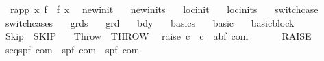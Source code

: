\begin{isabellebody}
\ \ \ {\isachardoublequoteopen}rapp\ x\ f\ {\isacharequal}\ f\ x{\isachardoublequoteclose}\isanewline
\isanewline
\isanewline
{}\isamarkupfalse%
\isanewline
\ \ newinit\ \isanewline
\ \ newinits\ \isanewline
\ \ locinit\ \isanewline
\ \ locinits\ \isanewline
\ \ switchcase\ \isanewline
\ \ switchcases\ \isanewline
\ \ grds\ \isanewline
\ \ grd\ \isanewline
\ \ bdy\ \isanewline
\ \ basics\ \isanewline
\ \ basic\ \isanewline
\ \ basicblock\isanewline
\isanewline
{}\isamarkupfalse%
\isanewline
\ \ Skip\ \ {\isacharparenleft}{\isachardoublequoteopen}SKIP{\isachardoublequoteclose}{\isacharparenright}\ \isanewline
\ \ Throw\ \ {\isacharparenleft}{\isachardoublequoteopen}THROW{\isachardoublequoteclose}{\isacharparenright}\isanewline
\isanewline
{}\isamarkupfalse%
\isanewline
\ \ {\isachardoublequoteopen}{\isacharunderscore}raise{\isachardoublequoteclose}{\isacharcolon}{\isacharcolon}\ {\isachardoublequoteopen}{\isacharprime}c\ {\isasymRightarrow}\ {\isacharprime}c\ {\isasymRightarrow}\ {\isacharparenleft}{\isacharprime}a{\isacharcomma}{\isacharprime}b{\isacharcomma}{\isacharprime}f{\isacharparenright}\ com{\isachardoublequoteclose}\ \ \ \ \ \ \ {\isacharparenleft}{\isachardoublequoteopen}{\isacharparenleft}RAISE\ {\isacharunderscore}\ {\isacharcolon}{\isacharequal}{\isacharequal}{\isacharslash}\ {\isacharunderscore}{\isacharparenright}{\isachardoublequoteclose}\ {\isacharbrackleft}{}{}{\isacharcomma}\ {}{}{\isacharbrackright}\ {}{}{\isacharparenright}\isanewline
\ \ {\isachardoublequoteopen}{\isacharunderscore}seq{\isachardoublequoteclose}{\isacharcolon}{\isacharcolon}{\isachardoublequoteopen}{\isacharparenleft}{\isacharprime}s{\isacharcomma}{\isacharprime}p{\isacharcomma}{\isacharprime}f{\isacharparenright}\ com\ {\isasymRightarrow}\ {\isacharparenleft}{\isacharprime}s{\isacharcomma}{\isacharprime}p{\isacharcomma}{\isacharprime}f{\isacharparenright}\ com\ {\isasymRightarrow}\ {\isacharparenleft}{\isacharprime}s{\isacharcomma}{\isacharprime}p{\isacharcomma}{\isacharprime}f{\isacharparenright}\ com{\isachardoublequoteclose}\ {\isacharparenleft}{\isachardoublequoteopen}{\isacharunderscore}{\isacharsemicolon}{\isacharsemicolon}{\isacharslash}\ {\isacharunderscore}{\isachardoublequoteclose}\ {\isacharbrackleft}{}{}{\isacharcomma}\ {}{}{\isacharbrackright}\ {}{}{\isacharparenright}\isanewline

\end{isabellebody}
